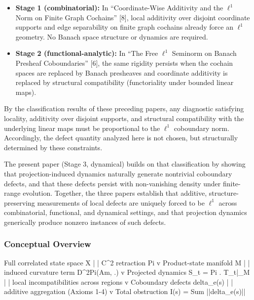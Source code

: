 \documentclass[
]{article}
\newenvironment{Shaded}{}{}
\newcommand{\NormalTok}[1]{#1}
\providecommand{\tightlist}{%
  \setlength{\itemsep}{0pt}\setlength{\parskip}{0pt}}
\begin{document}
\begin{itemize}
\tightlist
\item
  \textbf{Stage 1 (combinatorial):} In ``Coordinate-Wise Additivity and
  the \(\ell^1\) Norm on Finite Graph Cochains'' {[}8{]}, local
  additivity over disjoint coordinate supports and edge separability on
  finite graph cochains already force an \(\ell^1\) geometry. No Banach
  space structure or dynamics are required.
\item
  \textbf{Stage 2 (functional-analytic):} In ``The Free \(\ell^1\)
  Seminorm on Banach Presheaf Coboundaries'' {[}6{]}, the same rigidity
  persists when the cochain spaces are replaced by Banach presheaves and
  coordinate additivity is replaced by structural compatibility
  (functoriality under bounded linear maps).
\end{itemize}

By the classification results of these preceding papers, any diagnostic
satisfying locality, additivity over disjoint supports, and structural
compatibility with the underlying linear maps must be proportional to
the \(\ell^1\) coboundary norm. Accordingly, the defect quantity
analyzed here is not chosen, but structurally determined by these
constraints.

The present paper (Stage 3, dynamical) builds on that classification by
showing that projection-induced dynamics naturally generate nontrivial
coboundary defects, and that these defects persist with non-vanishing
density under finite-range evolution. Together, the three papers
establish that additive, structure-preserving measurements of local
defects are uniquely forced to be \(\ell^1\) across combinatorial,
functional, and dynamical settings, and that projection dynamics
generically produce nonzero instances of such defects.

\subsubsection{Conceptual Overview}\label{conceptual-overview}

\begin{Shaded}
\begin{Highlighting}[]
\NormalTok{Full correlated state space X}
\NormalTok{        |}
\NormalTok{        |  C\^{}2 retraction Pi}
\NormalTok{        v}
\NormalTok{Product{-}state manifold M}
\NormalTok{        |}
\NormalTok{        |  induced curvature term D\^{}2Pi(Am, .)}
\NormalTok{        v}
\NormalTok{Projected dynamics S\_t = Pi . T\_t|\_M}
\NormalTok{        |}
\NormalTok{        |  local incompatibilities across regions}
\NormalTok{        v}
\NormalTok{Coboundary defects delta\_e(s)}
\NormalTok{        |}
\NormalTok{        |  additive aggregation (Axioms 1{-}4)}
\NormalTok{        v}
\NormalTok{Total obstruction  I(s) = Sum ||delta\_e(s)||}
\end{Highlighting}
\end{Shaded}
\end{document}
